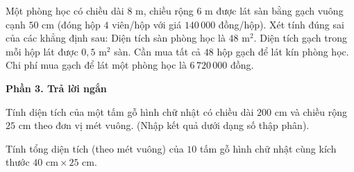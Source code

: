 \begin{ex} %
Một phòng học có chiều dài $8\text{ m}$, chiều rộng $6\text{ m}$ được lát sàn bằng gạch vuông cạnh $50\text{ cm}$ (đóng hộp $4$ viên/hộp với giá $140\,000$ đồng/hộp). Xét tính đúng sai của các khẳng định sau:
\choiceTF
{\True Diện tích sàn phòng học là $48\text{ m}^2$.}
{Diện tích gạch trong mỗi hộp lát được $0{,}5\text{ m}^2$ sàn.}
{\True Cần mua tất cả $48$ hộp gạch để lát kín phòng học.}
{\True Chi phí mua gạch để lát một phòng học là $6\,720\,000$ đồng.}
\end{ex}

\textbf{Phần 3. Trả lời ngắn}

\begin{ex} %
Tính diện tích của một tấm gỗ hình chữ nhật có chiều dài $200\text{ cm}$ và chiều rộng $25\text{ cm}$ theo đơn vị mét vuông. (Nhập kết quả dưới dạng số thập phân).
\end{ex}

\begin{ex} %
Tính tổng diện tích (theo mét vuông) của $10$ tấm gỗ hình chữ nhật cùng kích thước $40\text{ cm} \times 25\text{ cm}$.
\end{ex}

